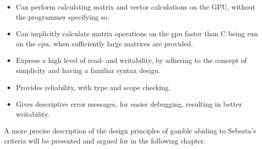 \begin{itemize}
	\item Can perform calculating matrix and vector calculations on the GPU, without the programmer specifying so.
	\item Can implicitly calculate matrix operations on the \acrshort{gpu} faster than C being run on the \acrshort{cpu}, when sufficiently large matrices are provided.
	\item Express a high level of read- and writability, by adhering to the concept of simplicity and having a familiar syntax design.
	\item Provides reliability, with type and scope checking.
	\item Gives descriptive error messages, for easier debugging, resulting in better writability.
\end{itemize}

A more precise description of the design principles of \gls{gamble} abiding to Sebesta's criteria will be presented and argued for in the following chapter.

